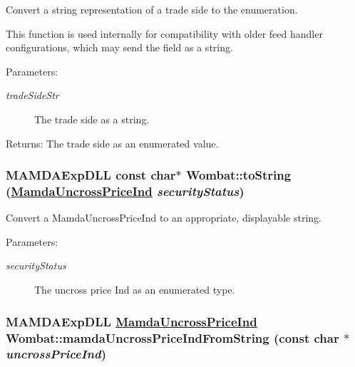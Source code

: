 Convert a string representation of a trade side to the enumeration. 

This function is used internally for compatibility with older feed handler configurations, which may send the field as a string.

\begin{Desc}
\item[Parameters:]
\begin{description}
\item[{\em trade\-Side\-Str}]The trade side as a string.\end{description}
\end{Desc}
\begin{Desc}
\item[Returns:]The trade side as an enumerated value. \end{Desc}
\hypertarget{namespaceWombat_bc5a101298a4f5b1d0ede524fd2bf142}{
\subsubsection[toString]{\setlength{\rightskip}{0pt plus 5cm}MAMDAExp\-DLL const char$\ast$ Wombat::to\-String (\hyperlink{namespaceWombat_4f0ec767cbe150ee160f65e719e76226}{Mamda\-Uncross\-Price\-Ind} {\em security\-Status})}}
\label{namespaceWombat_bc5a101298a4f5b1d0ede524fd2bf142}


Convert a Mamda\-Uncross\-Price\-Ind to an appropriate, displayable string. 

\begin{Desc}
\item[Parameters:]
\begin{description}
\item[{\em security\-Status}]The uncross price Ind as an enumerated type. \end{description}
\end{Desc}
\hypertarget{namespaceWombat_238c25b0feeb411e0536614c3a0b3a1f}{
\subsubsection[mamdaUncrossPriceIndFromString]{\setlength{\rightskip}{0pt plus 5cm}MAMDAExp\-DLL \hyperlink{namespaceWombat_4f0ec767cbe150ee160f65e719e76226}{Mamda\-Uncross\-Price\-Ind} Wombat::mamda\-Uncross\-Price\-Ind\-From\-String (const char $\ast$ {\em uncross\-Price\-Ind})}}
\label{namespaceWombat_238c25b0feeb411e0536614c3a0b3a1f}



